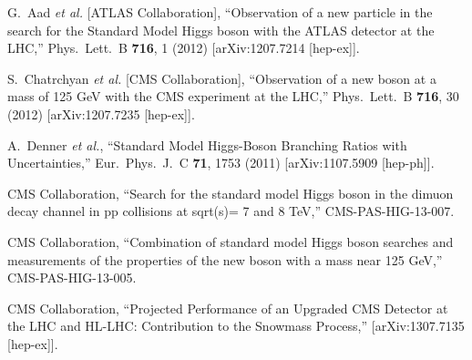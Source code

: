\documentclass[10pt]{article}
\begin{document}
\begin{thebibliography}{99}


  G.~Aad {\it et al.}  [ATLAS Collaboration],
  ``Observation of a new particle in the search for the Standard Model Higgs boson with the ATLAS detector at the LHC,''
  Phys.\ Lett.\ B {\bf 716}, 1 (2012)
  [arXiv:1207.7214 [hep-ex]].
  
  S.~Chatrchyan {\it et al.}  [CMS Collaboration],
  ``Observation of a new boson at a mass of 125 GeV with the CMS experiment at the LHC,''
  Phys.\ Lett.\ B {\bf 716}, 30 (2012)
  [arXiv:1207.7235 [hep-ex]].


  A.~Denner {\it et al.},
  ``Standard Model Higgs-Boson Branching Ratios with Uncertainties,''
  Eur.\ Phys.\ J.\ C {\bf 71}, 1753 (2011)
  [arXiv:1107.5909 [hep-ph]].


  CMS Collaboration,
  ``Search for the standard model Higgs boson in the dimuon decay channel 
in pp collisions at sqrt(s)= 7 and 8 TeV,''
  CMS-PAS-HIG-13-007.

  CMS Collaboration,
  ``Combination of standard model Higgs boson searches and measurements of the properties of the new boson with a mass near 125 GeV,''
  CMS-PAS-HIG-13-005.

  CMS Collaboration,
  ``Projected Performance of an Upgraded CMS Detector at the LHC and HL-LHC: Contribution to the Snowmass Process,''
  [arXiv:1307.7135 [hep-ex]].

\end{thebibliography}

 
\end{document}
